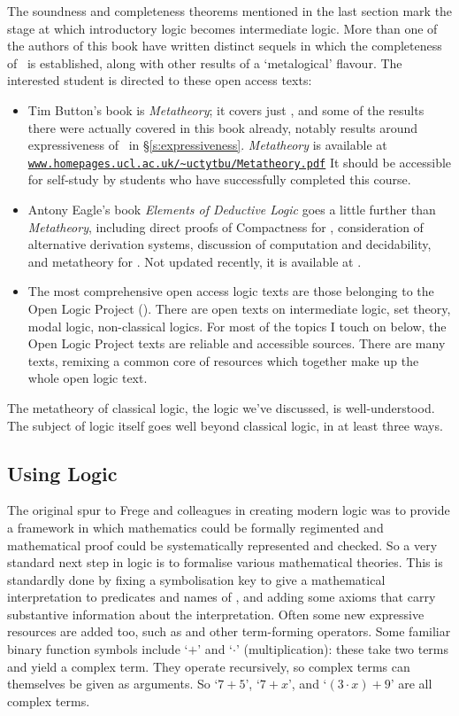 The soundness and completeness theorems mentioned in the last section mark the stage at which introductory logic becomes intermediate logic. More than one of the authors of this book have written distinct sequels in which the completeness of \TFL\ is established, along with other results of a `metalogical' flavour. The interested student is directed to these open access texts: \begin{itemize}
	\item Tim Button's book is \emph{Metatheory}; it covers just \TFL, and some of the results there were actually covered in this book already, notably results around expressiveness of \TFL\ in §\ref{s:expressiveness}. \emph{Metatheory} is available at \href{http://www.homepages.ucl.ac.uk/~uctytbu/Metatheory.pdf}{\nolinkurl{www.homepages.ucl.ac.uk/~uctytbu/Metatheory.pdf}} It should be accessible for self-study by students who have successfully completed this course.

\item Antony Eagle's book \emph{Elements of Deductive Logic} goes a little further than \emph{Metatheory}, including direct proofs of Compactness for \TFL, consideration of alternative derivation systems, discussion of computation and decidability, and metatheory for \FOL. Not updated recently, it is available at .
\item The most comprehensive open access logic texts are those belonging to the Open Logic Project (). There are open texts on intermediate logic, set theory, modal logic, non-classical logics. For most of the topics I touch on below, the Open Logic Project texts are reliable and accessible sources. There are many texts, remixing a common core of resources which together make up the whole open logic text. 
\end{itemize}

The metatheory of classical logic, the logic we've discussed, is well-understood. The subject of logic itself goes well beyond classical logic, in at least three ways.

\subsection{Using Logic} The original spur to Frege and colleagues in creating modern logic was to provide a framework in which mathematics could be formally regimented and mathematical proof could be systematically represented and checked. So a very standard next step in logic is to formalise various mathematical theories. This is standardly done by fixing a symbolisation key to give a mathematical interpretation to predicates and names of \FOL, and adding some axioms that carry substantive information about the interpretation. Often some new expressive resources are added too, such as  and other term-forming operators. Some familiar binary function symbols include `$+$' and `$\cdot$' (multiplication): these take two terms and yield a complex term. They operate recursively, so complex terms can themselves be given as arguments. So `$7+5$', `$7+x$', and `$(3\cdot x) + 9$' are all complex terms. 


